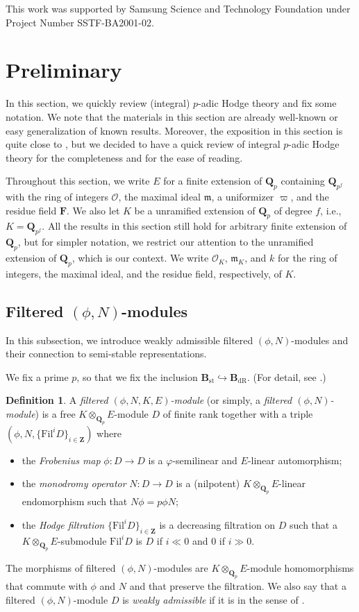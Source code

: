 \documentclass[11pt]{amsart}
\theoremstyle{definition}
\numberwithin{equation}{subsection}
\theoremstyle{plain}
\theoremstyle{plain}
\theoremstyle{plain}
\theoremstyle{plain}
\theoremstyle{plain}
\theoremstyle{plain}
\theoremstyle{plain}
\theoremstyle{plain}
\theoremstyle{plain}
\theoremstyle{plain}
\theoremstyle{plain}
\theoremstyle{plain}
\theoremstyle{definition}
\newtheorem{defi}[equation]{Definition}
\theoremstyle{definition}
\theoremstyle{definition}
\theoremstyle{remark}
\renewcommand{\(}{\textup{(}}
\renewcommand{\)}{\textup{)}}
\newcommand{\Q}{\mathbf{Q}}
\newcommand{\Z}{\mathbf{Z}}
\newcommand{\F}{\mathbf{F}}
\newcommand{\Bst}{\mathbf{B}_{\mathrm{st}}}
\newcommand{\Bdr}{\mathbf{B}_{\mathrm{dR}}}
\newcommand{\fm}{\mathfrak{m}}
\newcommand{\Fil}{\mathrm{Fil}}
\newcommand{\cO}{\mathcal{O}}
\begin{document}
This work was supported by Samsung Science and Technology Foundation under Project Number SSTF-BA2001-02.


\smallskip

\section{Preliminary}\label{sec: preliminary}
In this section, we quickly review (integral) $p$-adic Hodge theory and fix some notation. We note that the materials in this section are already well-known or easy generalization of known results. Moreover, the exposition in this section is quite close to \cite{GP,Par}, but we decided to have a quick review of integral $p$-adic Hodge theory for the completeness and for the ease of reading.


Throughout this section, we write $E$ for a finite extension of $\Q_p$ containing $\Q_{p^f}$ with the ring of integers $\cO$, the maximal ideal $\fm$, a uniformizer $\varpi$, and the residue field $\F$. We also let $K$ be a unramified extension of $\Q_p$ of degree $f$, i.e., $K=\Q_{p^f}$. All the results in this section still hold for arbitrary finite extension of $\Q_p$, but for simpler notation, we restrict our attention to the unramified extension of $\Q_p$, which is our context. We write $\cO_K$, $\fm_K$, and $k$ for the ring of integers, the maximal ideal, and the residue field, respectively, of $K$.

\subsection{Filtered $(\phi,N)$-modules}
In this subsection, we introduce weakly admissible filtered $(\phi,N)$-modules and their connection to semi-stable representations.

We fix a prime $p$, so that we fix the inclusion $\Bst\hookrightarrow\Bdr$. (For detail, see \cite{Fon94}.)
\begin{defi}
A \emph{filtered $(\phi,N,K,E)$-module} (or simply, a \emph{filtered $(\phi,N)$-module}) is a free $K\otimes_{\Q_p}E$-module $D$ of finite rank together with a triple $\left(\phi,N,\{\Fil^iD\}_{i\in\Z}\right)$ where
\begin{itemize}[leftmargin=*]
\item the \emph{Frobenius map} $\phi:D\rightarrow D$ is a $\varphi$-semilinear and $E$-linear automorphism;
\item the \emph{monodromy operator} $N:D\rightarrow D$ is a (nilpotent) $K\otimes_{\Q_p}E$-linear endomorphism such that $N\phi=p\phi N$;
\item the \emph{Hodge filtration} $\{\Fil^{i}D\}_{i\in\Z}$ is a decreasing filtration on $D$ such that a $K\otimes_{\Q_p}E$-submodule $\Fil^{i}D$ is
$D$ if $i\ll 0$ and $0$ if $i\gg 0$.
\end{itemize}
The morphisms of filtered $(\phi,N)$-modules are $K\otimes_{\Q_p} E$-module homomorphisms that commute with $\phi$ and $N$ and that preserve the filtration. We also say that a filtered $(\phi,N)$-module $D$ is \emph{weakly admissible} if it is in the sense of \cite{BM}.
\end{defi}
\end{document}
